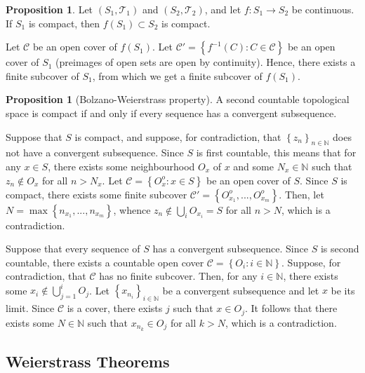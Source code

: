\documentclass[11pt]{article}
\theoremstyle{definition}
\newtheorem{prop}[thm]{Proposition}
\newcommand{\set}[1]{\left\{ #1 \right\}}
\newcommand{\NN}{\mathbb{N}}
\newcommand{\m}[1]{\mathcal{#1}}
\begin{document}
\begin{prop}
Let $(S_1,\m{T}_1)$ and $(S_2,\m{T}_2)$, and let $f:S_1\to S_2$ be continuous. If $S_1$ is
compact, then $f(S_1)\subset S_2$ is compact.
\end{prop}
\proof
Let $\m{C}$ be an open cover of $f(S_1)$. Let $\m{C}'=\set{f^{-1}(C):C\in\m{C}}$ be an open
cover of $S_1$ (preimages of open sets are open by continuity). Hence, there exists a
finite subcover of $S_1$, from which we get a finite subcover of $f(S_1)$.
\qedhere

\begin{prop}[Bolzano-Weierstrass property]
A second countable topological space is compact if and only if every sequence has a
convergent subsequence.
\end{prop}
\proof
Suppose that $S$ is compact, and suppose, for contradiction, that $\set{z_n}_{n\in\NN}$
does not have a convergent subsequence. Since $S$ is first countable, this means that for
any $x\in S$, there exists some neighbourhood $O_x$ of $x$ and some $N_x\in\NN$ such that
$z_n\notin O_x$ for all $n>N_x$.  Let $\m{C}=\set{O_x^o:x\in S}$ be an open cover of $S$.
Since $S$ is compact, there exists some finite subcover
$\m{C}'=\set{O_{x_1}^o,...,O_{x_m}^o}$. Then, let $N=\max\set{n_{x_1},...,n_{x_m}}$, whence
$z_n\notin\bigcup_iO_{x_i}=S$ for all $n>N$, which is a contradiction.

Suppose that every sequence of $S$ has a convergent subsequence. Since $S$ is second
countable, there exists a countable open cover $\m{C}=\set{O_i:i\in\NN}$. Suppose, for
contradiction, that $\m{C}$ has no finite subcover. Then, for any $i\in\NN$, there exists
some $x_i\notin\bigcup_{j=1}^iO_j$. Let $\set{x_{n_i}}_{i\in\NN}$ be a convergent
subsequence and let $x$ be its limit. Since $\m{C}$ is a cover, there exists $j$ such that
$x\in O_j$. It follows that there exists some $N\in\NN$ such that $x_{n_k}\in O_j$ for all
$k>N$, which is a contradiction.
\qedhere






\subsection{Weierstrass Theorems}
\end{document}
